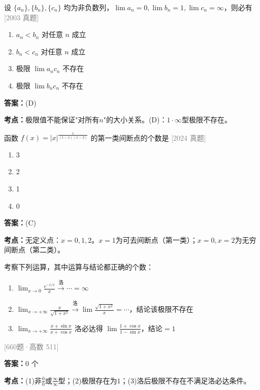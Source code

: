 \documentclass[12pt,a4paper]{ctexbook}
\newcommand{\src}[1]{\hfill\textcolor{gray}{\small\textsf{[#1]}}}
\newcommand{\ans}[1]{\begin{answerbox}\textbf{答案：}#1\end{answerbox}}
\newcommand{\kpt}[1]{\textbf{考点：}#1}
\begin{document}
\bigskip

\begin{exercise}[2003 数学二·第1题]
设 $\{a_n\},\{b_n\},\{c_n\}$ 均为非负数列，$\lim a_n=0,\lim b_n=1,\lim c_n=\infty$，则必有 \hfill\src{2003 真题}
\begin{enumerate}[label=(\Alph*),nosep]
  \item $a_n<b_n$ 对任意 $n$ 成立
  \item $b_n<c_n$ 对任意 $n$ 成立
  \item 极限 $\lim a_nc_n$ 不存在
  \item 极限 $\lim b_nc_n$ 不存在
\end{enumerate}
\end{exercise}
\ans{(D)}
\kpt{极限值不能保证"对所有$n$"的大小关系。(D)：$1\cdot\infty$型极限不存在。}

\bigskip

\begin{exercise}[2024 数学二·第1题]
函数 $f(x)=|x|^{\frac{1}{(1-x)(x-2)}}$ 的第一类间断点的个数是 \hfill\src{2024 真题}
\begin{enumerate}[label=(\Alph*),nosep]
  \item 3
  \item 2
  \item 1
  \item 0
\end{enumerate}
\end{exercise}
\ans{(C)}
\kpt{无定义点：$x=0,1,2$。$x=1$为可去间断点（第一类）；$x=0,x=2$为无穷间断点（第二类）。}

\bigskip

\begin{exercise}[660题·洛必达法则条件]
考察下列运算，其中运算与结论都正确的个数：
\begin{enumerate}[label=(\arabic*),nosep]
  \item $\lim_{x\to 0}\frac{e^{-1/x}}{x}\xrightarrow{\text{洛}}\cdots=\infty$
  \item $\lim_{x\to +\infty}\frac{x}{\sqrt{1+x^2}}\xrightarrow{\text{洛}}\lim\frac{\sqrt{1+x^2}}{x}=\cdots$，结论该极限不存在
  \item $\lim_{x\to +\infty}\frac{x+\sin x}{x+\cos x}$ 洛必达得 $\lim\frac{1+\cos x}{1-\sin x}$，结论$=1$
\end{enumerate}
\src{660题·高数 511}
\end{exercise}
\ans{0 个}
\kpt{(1)非$\frac{0}{0}$或$\frac{\infty}{\infty}$型；(2)极限存在为$1$；(3)洛后极限不存在不满足洛必达条件。}

\bigskip
\end{document}
